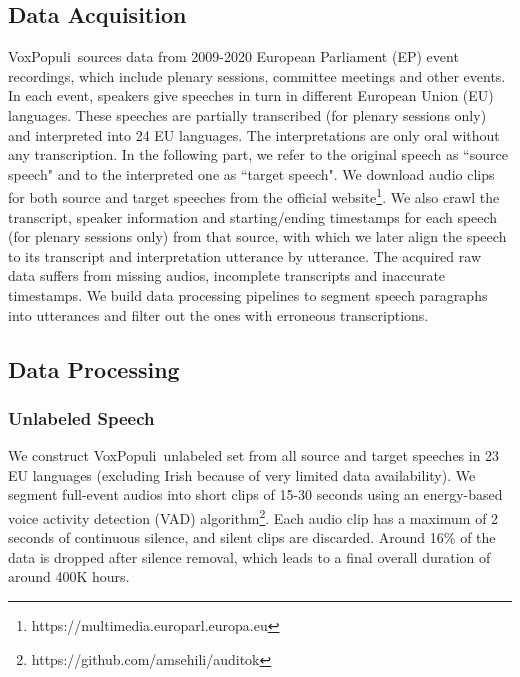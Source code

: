 \documentclass[11pt,a4paper]{article}
\newcommand{\vp}{VoxPopuli}
\begin{document}
\subsection{Data Acquisition}
\vp~sources data from 2009-2020 European Parliament (EP) event recordings, which include plenary sessions, committee meetings and other events. In each event, speakers give speeches in turn in different European Union (EU) languages. These speeches are partially transcribed (for plenary sessions only)
and interpreted into 24 EU languages. The interpretations are only oral without any transcription. In the following part, we refer to the original speech as ``source speech" and to the interpreted one as ``target speech".
We download audio clips for both source and target speeches from the official website\footnote{https://multimedia.europarl.europa.eu}. We also crawl the transcript, speaker information and starting/ending timestamps for each speech (for plenary sessions only) from that source, with which we later align the speech to its transcript and interpretation utterance by utterance. The acquired raw data suffers from missing audios, incomplete transcripts and inaccurate timestamps. We build data processing pipelines to segment speech paragraphs into utterances and filter out the ones with erroneous transcriptions.


\subsection{Data Processing}
\label{sec:data_processing}
\subsubsection{Unlabeled Speech}
We construct \vp~unlabeled set from all source and target speeches in 23 EU languages (excluding Irish because of very limited data availability). We segment full-event audios into short clips of 15-30 seconds using an energy-based voice activity detection (VAD) algorithm\footnote{https://github.com/amsehili/auditok}. Each audio clip has a maximum of 2 seconds of continuous silence, and silent clips are discarded. Around 16\% of the data is dropped after silence removal, which leads to a final overall duration of around 400K hours.


\end{document}
